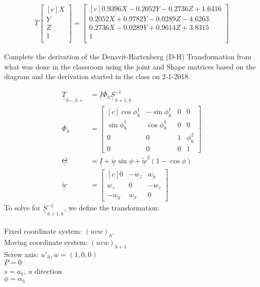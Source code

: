 \documentclass[onecolumn,10pt]{jhwhw}
\def\du#1{\underline{\underline{#1}}}
\begin{document}
\begin{align*}
T
\begin{bmatrix*}[c]
X \\
Y \\
Z \\
1 \\
\end{bmatrix*}
=
\begin{bmatrix*}[c]
0.9396 X -  0.2052 Y -  0.2736 Z +  1.6416 \\
0.2052 X +  0.9782 Y -  0.0289 Z -  4.6263 \\
0.2736 X -  0.0289 Y +  0.9614 Z +  3.8315 \\
                                         1 \\
\end{bmatrix*}
\end{align*}

\problem{}
Complete the derivation of the Denavit-Hartenberg (D-H) Transformation from what was done in the classroom using the joint and Shape matrices based on the diagram and the derivation started in the class on 2-1-2018.

\begin{align*}
\du{T}_{h-, h+} &= \du{I} \Phi_{h} \du{S}^{-1}_{h+1, h} \\
\Phi_{h} &=
\begin{bmatrix*}[c]
\cos \phi_h^1 & -\sin \phi_h^1 & 0 & 0 \\
\sin \phi_h^1 &  \cos \phi_h^1 & 0 & 0 \\
0 & 0 & 1 & \phi_h^2 \\
0 & 0 & 0 & 1
\end{bmatrix*} \\
\du{\Theta} &= \du{I} + \du{\widetilde{w}} \sin \phi + \du{\widetilde{w}}^2 \left ( 1 - \cos\phi \right ) \\
\du{\widetilde{w}} &= 
\begin{bmatrix*}[c]
0 & -w_z & w_y \\
w_z & 0 & -w_z \\
-w_y & w_x & 0
\end{bmatrix*} 
\end{align*}
To solve for $\du{S}^{-1}_{h+1, h}$, we define the transformation: \\
\\
Fixed coordinate system: $(u v w)_{h'}$ \\
Moving coordinate system: $(u v w)_{h+1}$ \\
Screw axis: $u'_h, w = (1, 0, 0)$ \\
$\underline{P} = \underline{0}$ \\
$s = a_h$, $u$ direction \\
$\phi = \alpha_h$
\end{document}

